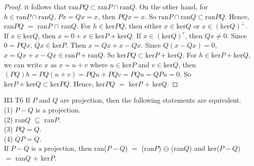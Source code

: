 \begin{proof}
    it follows that $\text{ran}PQ\subset \text{ran}P\cap\text{ran}Q$.
    On the other hand, for $h\in \text{ran}P\cap\text{ran}Q$, $Px=Qx=x$, then $PQx=x$.
    So $\text{ran}P\cap\text{ran}Q\subset \text{ran}PQ$.
    Hence, ran$PQ$ $=$ ran$P$ $\cap$ ran$Q$.
    For $h\in\text{ker}PQ$, then either $x\in \text{ker}Q$ or $x\in (\text{ker}Q)^{\perp}$.
    If $x\in \text{ker}Q$, then $x=0+x\in \text{ker}P+\text{ker}Q$.
    If $x\in (\text{ker}Q)^c$, then $Qx\neq 0$. Since $0=PQx$, $Qx\in\text{ker}P$.
    Then $x=Qx+x-Qx$. Since $Q(x-Qx)=0$, $x=Qx+x-Qx\in \text{ran}P+\text{ran}Q$.
    So $\text{ker}PQ\subset \text{ker}P+\text{ker}Q$.
    For $h\in \text{ker}P+\text{ker}Q$, we can write $x$ as $x=u+v$ where $u\in\text{ker}P$ and $v\in\text{ker}Q$,
    then $(PQ)h=PQ(u+v)=PQu+PQv=PQu=QPu=0$.
    So $\text{ker}P+\text{ker}Q\subset \text{ker}PQ$.
    Hence, ker$PQ$ $=$ ker$P$ $+$ ker$Q$.
\end{proof}

\begin{exercise}{II3 T6}{}
    If $P$ and $Q$ are projection, then the following statements are equivalent.\\
    (1) $P-Q$ is a projection.\\
    (2) ran$Q$ $\subseteq$ ran$P$.\\
    (3) $PQ=Q$.\\
    (4) $QP=Q$. \\
    If $P-Q$ is a projection, then
    ran($P-Q$) $=$ (ran$P$) $\ominus$ (ran$Q$) and ker($P-Q$) $=$ ran$Q$ $+$ ker$P$.
\end{exercise}

